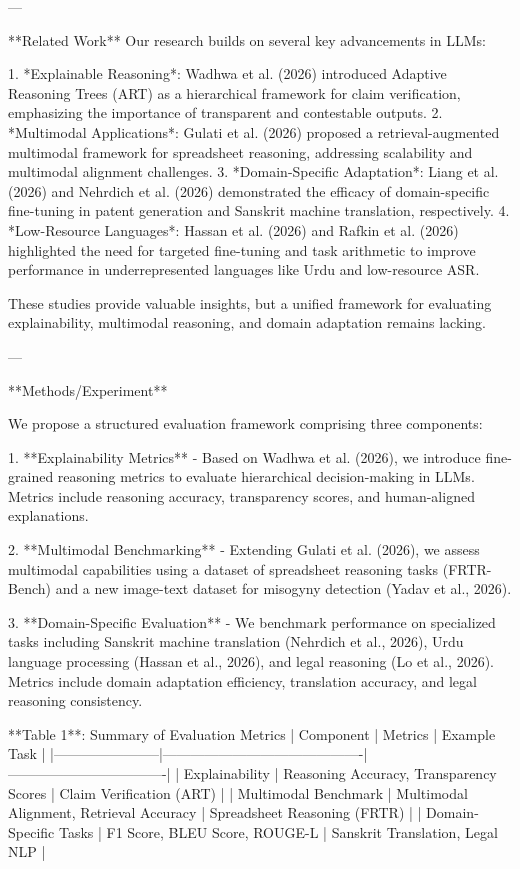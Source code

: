 ---

**Related Work**  
Our research builds on several key advancements in LLMs:  

1. *Explainable Reasoning*: Wadhwa et al. (2026) introduced Adaptive Reasoning Trees (ART) as a hierarchical framework for claim verification, emphasizing the importance of transparent and contestable outputs.  
2. *Multimodal Applications*: Gulati et al. (2026) proposed a retrieval-augmented multimodal framework for spreadsheet reasoning, addressing scalability and multimodal alignment challenges.  
3. *Domain-Specific Adaptation*: Liang et al. (2026) and Nehrdich et al. (2026) demonstrated the efficacy of domain-specific fine-tuning in patent generation and Sanskrit machine translation, respectively.  
4. *Low-Resource Languages*: Hassan et al. (2026) and Rafkin et al. (2026) highlighted the need for targeted fine-tuning and task arithmetic to improve performance in underrepresented languages like Urdu and low-resource ASR.  

These studies provide valuable insights, but a unified framework for evaluating explainability, multimodal reasoning, and domain adaptation remains lacking.

---

**Methods/Experiment**  

We propose a structured evaluation framework comprising three components:  

1. **Explainability Metrics**  
   - Based on Wadhwa et al. (2026), we introduce fine-grained reasoning metrics to evaluate hierarchical decision-making in LLMs. Metrics include reasoning accuracy, transparency scores, and human-aligned explanations.  

2. **Multimodal Benchmarking**  
   - Extending Gulati et al. (2026), we assess multimodal capabilities using a dataset of spreadsheet reasoning tasks (FRTR-Bench) and a new image-text dataset for misogyny detection (Yadav et al., 2026).  

3. **Domain-Specific Evaluation**  
   - We benchmark performance on specialized tasks including Sanskrit machine translation (Nehrdich et al., 2026), Urdu language processing (Hassan et al., 2026), and legal reasoning (Lo et al., 2026). Metrics include domain adaptation efficiency, translation accuracy, and legal reasoning consistency.  

**Table 1**: Summary of Evaluation Metrics  
| Component             | Metrics                                   | Example Task                     |  
|-----------------------|-------------------------------------------|----------------------------------|  
| Explainability        | Reasoning Accuracy, Transparency Scores  | Claim Verification (ART)         |  
| Multimodal Benchmark  | Multimodal Alignment, Retrieval Accuracy | Spreadsheet Reasoning (FRTR)     |  
| Domain-Specific Tasks | F1 Score, BLEU Score, ROUGE-L            | Sanskrit Translation, Legal NLP  |  

